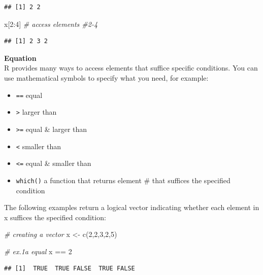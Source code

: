 \documentclass[
]{book}
\newenvironment{Shaded}{\begin{snugshade}}{\end{snugshade}}
\newcommand{\CommentTok}[1]{\textcolor[rgb]{0.56,0.35,0.01}{\textit{#1}}}
\newcommand{\DecValTok}[1]{\textcolor[rgb]{0.00,0.00,0.81}{#1}}
\newcommand{\FunctionTok}[1]{\textcolor[rgb]{0.00,0.00,0.00}{#1}}
\newcommand{\NormalTok}[1]{#1}
\newcommand{\OtherTok}[1]{\textcolor[rgb]{0.56,0.35,0.01}{#1}}
\newcommand{\SpecialCharTok}[1]{\textcolor[rgb]{0.00,0.00,0.00}{#1}}
\providecommand{\tightlist}{%
  \setlength{\itemsep}{0pt}\setlength{\parskip}{0pt}}
\begin{document}
\begin{verbatim}
## [1] 2 2
\end{verbatim}

\begin{Shaded}
\begin{Highlighting}[]
\NormalTok{x[}\DecValTok{2}\SpecialCharTok{:}\DecValTok{4}\NormalTok{] }\CommentTok{\# access elements \#2{-}4}
\end{Highlighting}
\end{Shaded}

\begin{verbatim}
## [1] 2 3 2
\end{verbatim}

\textbf{Equation}\\
R provides many ways to access elements that suffice specific conditions. You can use mathematical symbols to specify what you need, for example:

\begin{itemize}
\tightlist
\item
  \texttt{==} equal
\item
  \texttt{\textgreater{}} larger than
\item
  \texttt{\textgreater{}=} equal \& larger than
\item
  \texttt{\textless{}} smaller than
\item
  \texttt{\textless{}=} equal \& smaller than
\item
  \texttt{which()} a function that returns element \# that suffices the specified condition
\end{itemize}

The following examples return a logical vector indicating whether each element in x suffices the specified condition:

\begin{Shaded}
\begin{Highlighting}[]
\CommentTok{\# creating a vector}
\NormalTok{x }\OtherTok{\textless{}{-}} \FunctionTok{c}\NormalTok{(}\DecValTok{2}\NormalTok{,}\DecValTok{2}\NormalTok{,}\DecValTok{3}\NormalTok{,}\DecValTok{2}\NormalTok{,}\DecValTok{5}\NormalTok{)}

\CommentTok{\# ex.1a equal}
\NormalTok{x }\SpecialCharTok{==} \DecValTok{2}
\end{Highlighting}
\end{Shaded}

\begin{verbatim}
## [1]  TRUE  TRUE FALSE  TRUE FALSE
\end{verbatim}
\end{document}
